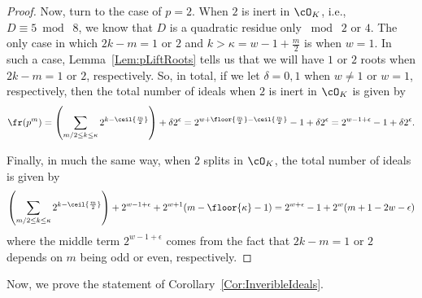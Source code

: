 \documentclass[11pt, proquest]{uwthesis}
\begin{document}
\begin{proof}
  Now, turn to the case of $p=2$.
  When $2$ is inert in $\cO_K$, i.e., $D\equiv 5\bmod\; 8$, we know that $D$ is a quadratic residue only $\bmod\; 2$ or $4$.
  The only case in which $2k-m=1$ or $2$ and $k >\kappa = w-1+\frac{m}{2}$ is when $w=1$.
  In such a case, Lemma~\ref{Lem:pLiftRoots} tells us that we will have $1$ or $2$ roots when $2k-m=1$ or $2$, respectively.
  So, in total, if we let $\delta = 0,1$ when $w\ne 1$ or $w=1$, respectively, then the total number of ideals when $2$ is inert in $\cO_K$ is given by
  \[
  \fr(p^m) =\left(\sum_{m/2\leq k\leq \kappa} 2^{k-\ceil{\frac{m}{2}}}\right) + \delta 2^{\epsilon} = 2^{w+\floor{\frac{m}{2}}-\ceil{\frac{m}{2}}}-1+ \delta 2^{\epsilon} = 2^{w-1+\epsilon}-1 +\delta 2^{\epsilon}.
  \]

  Finally, in much the same way, when $2$ splits in $\cO_K$, the total number of ideals is given by
 \[
  \left(\sum_{m/2\leq k\leq \kappa} 2^{k-\ceil{\frac{m}{2}}}\right) + 2^{w-1+\epsilon} + 2^{w+1}(m-\floor{\kappa} - 1) = 2^{w+\epsilon}-1+2^{w}(m+1-2w-\epsilon)
  \]
  where the middle term $2^{w-1+\epsilon}$ comes from the fact that $2k-m=1$ or $2$ depends on $m$ being odd or even, respectively.
\end{proof}

Now, we prove the statement of Corollary~\ref{Cor:InveribleIdeals}.
\end{document}
